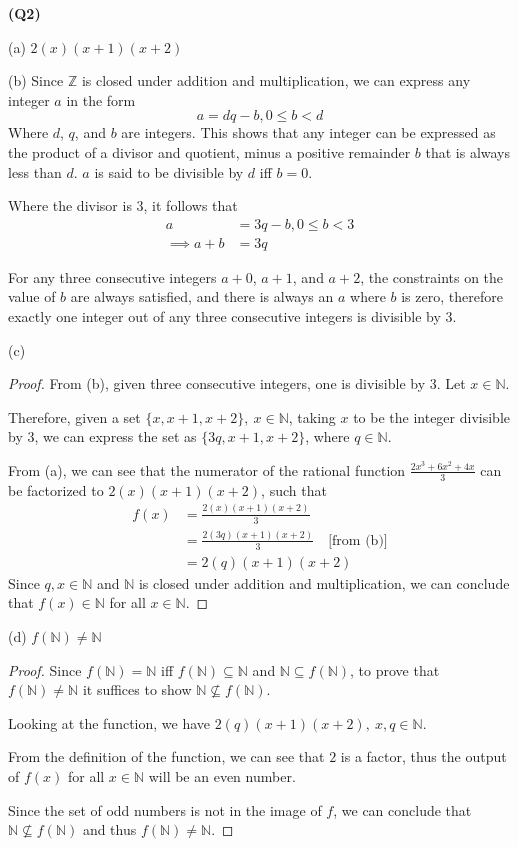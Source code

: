 \documentclass[12pt, a4paper]{article}
\newcommand{\Z}{\mathbb{Z}}
\newcommand{\N}{\mathbb{N}}
\newcommand{\sse}{\subseteq}
\newcommand{\emptyline}{\hfill\break}
\begin{document}
\noindent\textbf{(Q2)}

\noindent (a) $2(x)(x + 1)(x + 2)$

\emptyline
\noindent (b) Since $\Z$ is closed under addition and multiplication, we can 
express any integer $a$ in the form
\[
    a = dq - b, 0 \leq b < d
\]
Where $d$, $q$, and $b$ are integers. This shows that any integer can be expressed
as the product of a divisor and quotient, minus a positive remainder $b$ that is always
less than $d$. $a$ is said to be divisible by $d$ iff $b = 0$.

Where the divisor is 3, it follows that
\begin{align*}
    a & = 3q - b, 0 \leq b < 3\\
    \implies a + b & = 3q
\end{align*}

For any three consecutive integers $a + 0$, $a + 1$, and $a + 2$, the constraints on the 
value of $b$ are always satisfied, and there is always an $a$ where $b$ is zero, 
therefore exactly one integer out of any three consecutive integers is divisible by 3.

\emptyline
\noindent(c)

\begin{proof}
    From (b), given three consecutive integers, one is divisible by 3. Let $x \in \N$.
    
    Therefore, given
    a set $\{x, x + 1, x + 2\},\: x \in \N$, taking $x$ to be the integer divisible by 3, we can express
    the set as $\{3q, x + 1, x + 2\}$, where $q \in \N$.

    From (a), we can see that the numerator of the rational function $\tfrac{2x^3 + 6x^2 + 4x}{3}$
    can be factorized to $2(x)(x + 1)(x + 2)$, such that
    \begin{align*}
        f(x) & = \frac{2(x)(x + 1)(x + 2)}{3} \\
        & = \frac{2(3q)(x + 1)(x + 2)}{3} \quad\text{[from (b)]}\\
        & = 2(q)(x + 1)(x + 2)
    \end{align*}
    Since $q, x \in \N$ and $\N$ is closed under addition and multiplication, we can conclude
    that $f(x) \in \N$ for all $x \in \N$.

\end{proof}

\emptyline
\noindent(d)
$f(\N) \neq \N$

\begin{proof}
    Since $f(\N) = \N$ iff $f(\N) \sse \N$ and $\N \sse f(\N)$, to prove 
    that $f(\N) \neq \N$ it suffices to show $\N \nsubseteq f(\N)$.

    Looking at the function, we have $2(q)(x + 1)(x + 2),\: x, q \in \N$.

    From the definition of the function, we can see that $2$ is a factor, thus
    the output of $f(x)$ for all $x \in \N$ will be an even number.

    Since the set of odd numbers is not in the image of $f$, we can conclude that
    $\N \nsubseteq f(\N)$ and thus $f(\N) \neq \N$.
\end{proof}
\end{document}
